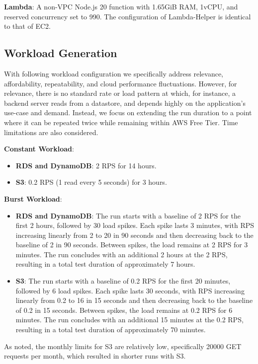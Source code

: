 \textbf{Lambda}:
A non-VPC Node.js 20 function with 1.65GiB RAM, 1vCPU, and reserved concurrency set to 990. The configuration of Lambda-Helper is identical to that of EC2.

\subsection{Workload Generation}
\label{sec:loads}

With following workload configuration we specifically address relevance, affordability, repeatability, and cloud performance fluctuations. However, for relevance, there is no standard rate or load pattern at which, for instance, a backend server reads from a datastore, and depends highly on the application's use-case and demand. Instead, we focus on extending the run duration to a point where it can be repeated twice while remaining within AWS Free Tier. Time limitations are also considered.

\textbf{Constant Workload}:
\begin{itemize}
	\item \textbf{RDS and DynamoDB}: 2 RPS for 14 hours.
	\item \textbf{S3}: 0.2 RPS (1 read every 5 seconds) for 3 hours.
\end{itemize}

\textbf{Burst Workload}:
\begin{itemize}
	\item \textbf{RDS and DynamoDB}: The run starts with a baseline of 2 RPS for the first 2 hours, followed by 30 load spikes. Each spike lasts 3 minutes, with RPS increasing linearly from 2 to 20 in 90 seconds and then decreasing back to the baseline of 2 in 90 seconds. Between spikes, the load remains at 2 RPS for 3 minutes. The run concludes with an additional 2 hours at the 2 RPS, resulting in a total test duration of approximately 7 hours.
	\item \textbf{S3}: The run starts with a baseline of 0.2 RPS for the first 20 minutes, followed by 6 load spikes. Each spike lasts 30 seconds, with RPS increasing linearly from 0.2 to 16 in 15 seconds and then decreasing back to the baseline of 0.2 in 15 seconds. Between spikes, the load remains at 0.2 RPS for 6 minutes. The run concludes with an additional 15 minutes at the 0.2 RPS, resulting in a total test duration of approximately 70 minutes.
\end{itemize}

As noted, the monthly limits for S3 are relatively low, specifically 20000 GET requests per month, which resulted in shorter runs with S3.

